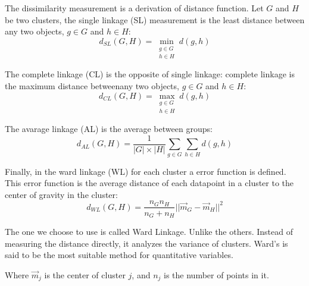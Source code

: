 \documentclass[a4paper, 12pt]{article}
\begin{document}
The dissimilarity measurement is a derivation of distance function. Let $G$ and $H$ be two clusters, the single linkage (SL) measurement is the least distance between any two objects, $g \in G$ and $h \in H$:
\begin{equation} \label{eq15}
    d_{SL}(G, H) = \min_{\substack{g \in G \\ h \in H}}d(g,h)
\end{equation}

The complete linkage (CL) is the opposite of single linkage: complete linkage is the maximum distance betweenany two objects, $g \in G$ and $h \in H$:
\begin{equation} \label{eq16}
    d_{CL}(G, H) = \max_{\substack{g \in G \\ h \in H}}d(g,h)
\end{equation}

The avarage linkage (AL) is the average between groups:
\begin{equation} \label{eq17}
    d_{AL}(G, H) = \frac{1}{|G| \times |H|}\sum_{g \in G}\sum_{h \in H}d(g,h)
\end{equation}

Finally, in the ward linkage (WL) for each cluster a error function is defined. This error function is the average distance of each datapoint in a cluster to the center of gravity in the cluster:
\begin{equation} \label{eq18}
    d_{WL}(G, H) = \frac{n_Gn_H}{n_G + n_H}||\vec{m}_G - \vec{m}_H||^2
\end{equation}

The one we choose to use is called Ward Linkage. Unlike the others. Instead of measuring the distance directly, it analyzes the variance of clusters. Ward’s is said to be the most suitable method for quantitative variables.

Where $\vec{m}_j$ is the center of cluster $j$, and $n_j$ is the number of points in it.

\pagebreak
\end{document}
